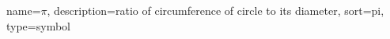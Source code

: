 {
  name={\ensuremath{\pi}},
  description={ratio of circumference of circle to its
               diameter},
  sort=pi,
  type=symbol
}
